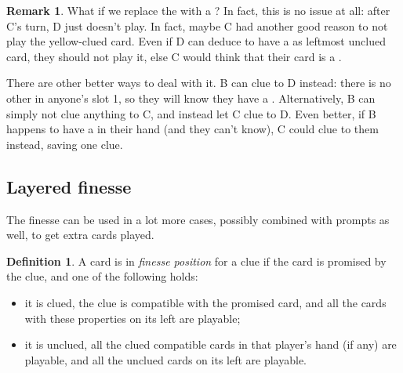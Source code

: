 \documentclass[a4paper]{article}
\theoremstyle{plain}
\theoremstyle{definition}
\newtheorem{definition}[theorem]{Definition}
\newtheorem{remark}[theorem]{Remark}
\begin{document}
\begin{remark}
	What if we replace the  with a ? In fact, this is no issue at all: after C's turn, D just doesn't play. In fact, maybe C had another good reason to not play the yellow-clued card. Even if D can deduce to have a  as leftmost unclued card, they should not play it, else C would think that their card is a .
	
	There are other better ways to deal with it. B can clue  to D instead: there is no other  in anyone's slot 1, so they will know they have a . Alternatively, B can simply not clue anything to C, and instead let C clue  to D. Even better, if B happens to have a  in their hand (and they can't know), C could clue  to them instead, saving one clue.
\end{remark}

\subsection{Layered finesse}

The finesse can be used in a lot more cases, possibly combined with prompts as well, to get extra cards played.

\begin{definition}
	\label{def:finesse-position}
	A card is in \emph{finesse position} for a clue if the card is promised by the clue, and one of the following holds:
	
	\begin{itemize}
		\item it is clued, the clue is compatible with the promised card, and all the cards with these properties on its left are playable;
		\item it is unclued, all the clued compatible cards in that player's hand (if any) are playable, and all the unclued cards on its left are playable.
	\end{itemize}
\end{definition}
\end{document}
